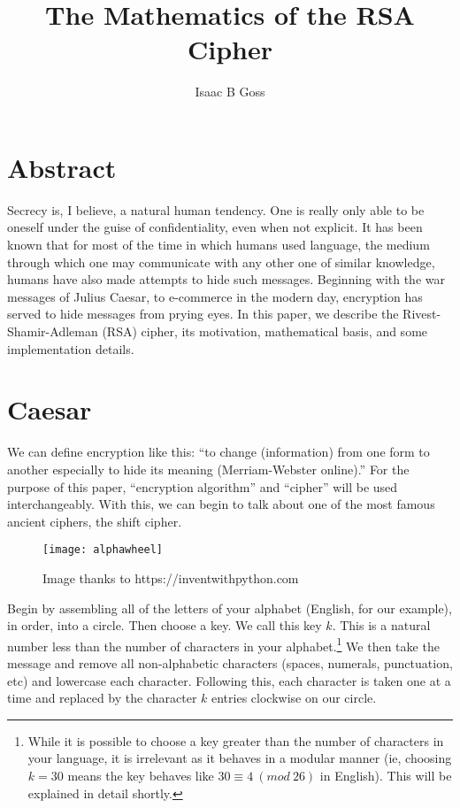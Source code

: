 \documentclass{article}
\begin{document}
\title{The Mathematics of the RSA Cipher}
\author{Isaac B Goss}
\maketitle

    \section{Abstract}
        Secrecy is, I believe, a natural human tendency.  One is really only able to be oneself under the guise of confidentiality, even when not explicit.  %
        It has been known that for most of the time in which humans used language, the medium through which one may communicate with any other one of similar knowledge, humans have also made attempts to hide such messages.
        Beginning with the war messages of Julius Caesar, to e-commerce in the modern day, encryption has served to hide messages from prying eyes.
        In this paper, we describe the Rivest-Shamir-Adleman (RSA) cipher, its motivation, mathematical basis, and some implementation details.
    \newpage
    \section{Caesar}
        We can define encryption like this: ``to change (information) from one form to another especially to hide its meaning (Merriam-Webster online).''  
        For the purpose of this paper, ``encryption algorithm'' and ``cipher'' will be used interchangeably.  
        With this, we can begin to talk about one of the most famous ancient ciphers, the shift cipher.  
        
        \begin{figure}[h]
        	\centering
        	\texttt{[image: alphawheel]}
        	\caption{Image thanks to https://inventwithpython.com}
        \end{figure}
        Begin by assembling all of the letters of your alphabet (English, for our example), in order, into a circle.  Then choose a key.  
        We call this key $k$.  
        This is a natural number less than the number of characters in your alphabet.\footnote{While it is possible to choose a key greater than the number of characters in your language, it is irrelevant as it behaves in a modular manner (ie, choosing $k=30$ means the key behaves like $30\equiv4\ (mod\ 26)$ in English). This will be explained in detail shortly.}
        We then take the message and remove all non-alphabetic characters (spaces, numerals, punctuation, etc) and lowercase each character.
        Following this, each character is taken one at a time and replaced by the character $k$ entries clockwise on our circle.
        
\end{document}
